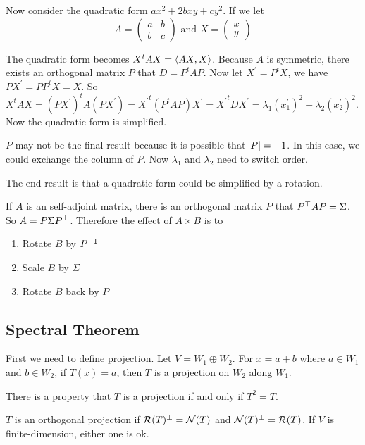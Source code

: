 \begin{example}
    Now consider the quadratic form $ax^2 + 2bxy + cy^2$. If we let 
\begin{equation}
    A = \begin{pmatrix}
        a & b \\
        b & c
    \end{pmatrix} \text{ and } X = \begin{pmatrix}
        x \\
        y
    \end{pmatrix}
\end{equation}

The quadratic form becomes $X^t A X = \left\langle \displaystyle AX, X \right\rangle$. Because $A$ is symmetric, there exists an orthogonal matrix $P$ that $D = P^t A P$. Now let $X^\prime = P^t X$, we have $PX^\prime = PP^tX = X$. So $X^t A X = (PX^\prime)^t A (PX^\prime) = {X^\prime}^t (P^t A P) X^\prime = {X^\prime}^t D X^\prime = \lambda_1 (x_1^\prime)^2 + \lambda_2 (x_2^\prime)^2$. Now the quadratic form is simplified.

$P$ may not be the final result because it is possible that $\abs{P} = -1$. In this case, we could exchange the column of $P$. Now $\lambda_1$ and $\lambda_2$ need to switch order.

The end result is that a quadratic form could be simplified by a rotation.
\end{example}

\begin{example}
    If $A$ is an self-adjoint matrix, there is an orthogonal matrix $P$ that ${P}^\top A P = \Sigma$. So $A = P \Sigma {P}^\top$. Therefore the effect of $A \times B$ is to
    \begin{enumerate}
        \item Rotate $B$ by ${P}^{-1}$
        \item Scale $B$ by $\Sigma$
        \item Rotate $B$ back by $P$
    \end{enumerate}
\end{example}



\subsection{Spectral Theorem}

\begin{definition}
    First we need to define projection. Let $V = W_1 \oplus W_2$. For $x = a + b$ where $a \in W_1$ and $b \in W_2$, if $T(x) = a$, then $T$ is a projection on $W_2$ along $W_1$.
    
    There is a property that $T$ is a projection if and only if $T^2 = T$.
    
    $T$ is an orthogonal projection if $\mathcal{R}(T)^\perp = \mathcal{N}(T)$ and $\mathcal{N}(T)^\perp = \mathcal{R}(T)$. If $V$ is finite-dimension, either one is ok.
\end{definition}

